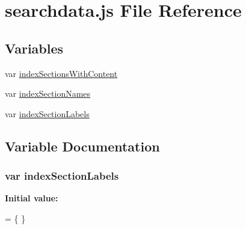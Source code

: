 \hypertarget{docs_2_programmer's_manual_2html_2search_2searchdata_8js}{}\section{searchdata.\+js File Reference}
\label{docs_2_programmer's_manual_2html_2search_2searchdata_8js}
\subsection*{Variables}
\begin{DoxyCompactItemize}
\item 
var \hyperlink{docs_2_programmer's_manual_2html_2search_2searchdata_8js_a6250af3c9b54dee6efc5f55f40c78126}{index\+Sections\+With\+Content}
\item 
var \hyperlink{docs_2_programmer's_manual_2html_2search_2searchdata_8js_a77149ceed055c6c6ce40973b5bdc19ad}{index\+Section\+Names}
\item 
var \hyperlink{docs_2_programmer's_manual_2html_2search_2searchdata_8js_a529972e449c82dc118cbbd3bcf50c44d}{index\+Section\+Labels}
\end{DoxyCompactItemize}


\subsection{Variable Documentation}
\hypertarget{docs_2_programmer's_manual_2html_2search_2searchdata_8js_a529972e449c82dc118cbbd3bcf50c44d}{}
\subsubsection[{index\+Section\+Labels}]{\setlength{\rightskip}{0pt plus 5cm}var index\+Section\+Labels}\label{docs_2_programmer's_manual_2html_2search_2searchdata_8js_a529972e449c82dc118cbbd3bcf50c44d}
{\bfseries Initial value\+:}
\begin{DoxyCode}
=
\{
\}
\end{DoxyCode}
\hypertarget{docs_2_programmer's_manual_2html_2search_2searchdata_8js_a77149ceed055c6c6ce40973b5bdc19ad}{}
